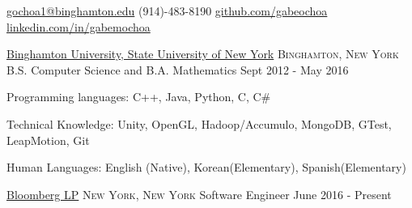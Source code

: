 \documentclass[11pt]{article}
\begin{document}


\nobreakvspace{0.3em}  %

\href{mailto:gochoa1@binghamton.edu}{gochoa1@binghamton.edu}\sbull
(914)-483-8190\sbull
\href{https://github.com/gabeochoa}{github.com/gabeochoa}\sbull
\href{https://www.linkedin.com/in/gabemochoa}{linkedin.com/in/gabemochoa}


\spacedhrule{0.1em}{0.5em}  %

\headedsection
{\href{http://www.binghamton.edu/index.php}{Binghamton University, State University of New York}}
{\textsc{Binghamton, New York}} {
    \inlineheadsection
    {B.S. Computer Science and B.A. Mathematics}
    {Sept 2012 - May 2016}
}


\spacedhrule{0.1em}{0.5em}  %

\inlineheadsection  %
{Programming languages:}
{ C++, Java,  Python, C, C\# }

\inlineheadsection
{Technical Knowledge:}
{ Unity, OpenGL, Hadoop/Accumulo, MongoDB, GTest, LeapMotion, Git }

\inlineheadsection
{Human Languages:}
{English (Native), Korean(Elementary), Spanish(Elementary)}


\spacedhrule{0.1em}{0.5em}  %

\headedsection  %
{\href{http://www.bloomberg.com/}{Bloomberg LP}}
{\textsc{New York, New York}} {
    \headedsubsection
    {Software Engineer}
    {June 2016 - Present}
    {
    }
}
\end{document}
